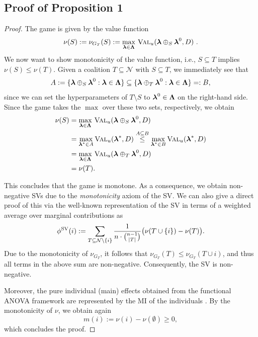 \documentclass[letterpaper]{article} %
\begin{document}
\subsection{Proof of Proposition 1}
\begin{proof}
The \dstunability game is given by the value function
\[
\nu(S) := \nu_{G_T}(S) := \max_{\boldsymbol{\lambda} \in \boldsymbol{\Lambda}}
\,\textsc{Val}_u(\boldsymbol{\lambda} \oplus_S \boldsymbol{\lambda}^0, D) \,\, .
\]
We now want to show monotonicity of the value function, i.e., $S \subseteq T$ implies $\nu(S) \leq \nu(T)$. 
Given a coalition $T \subseteq \mathcal N$ with $S \subseteq T$, we immediately see that
\[
    A := \{\boldsymbol{\lambda} \oplus_{S} \boldsymbol{\lambda}^0: \boldsymbol{\lambda} \in \boldsymbol{\Lambda} \} \subseteq \{ \boldsymbol{\lambda} \oplus_{T} \boldsymbol{\lambda}^0: \boldsymbol{\lambda} \in \boldsymbol{\Lambda} \} =: B,
\]
since we can set the hyperparameters of $T\setminus S$ to $\boldsymbol{\lambda}^0 \in \boldsymbol{\Lambda}$ on the right-hand side.
Since the \dstunability game takes the $\max$ over these two sets, respectively, we obtain
\begin{align*}
    \nu(S) &=  \max_{\boldsymbol{\lambda} \in \boldsymbol{\Lambda}} \,\textsc{Val}_u(\boldsymbol{\lambda} \oplus_S \boldsymbol{\lambda}^0, D)\\
    &= \max_{\boldsymbol{\lambda}^\ast \in A} \textsc{Val}_u(\boldsymbol{\lambda}^\ast, D) \overset{A \subseteq B}{\leq} \max_{\boldsymbol{\lambda}^\ast \in B} \textsc{Val}_u(\boldsymbol{\lambda}^\ast, D) \\
    &=  \max_{\boldsymbol{\lambda} \in \boldsymbol{\Lambda}}\,\textsc{Val}_u(\boldsymbol{\lambda} \oplus_T \boldsymbol{\lambda}^0, D)\\
    &= \nu(T).
\end{align*}

This concludes that the \dstunability game is monotone.
As a consequence, we obtain non-negative \glspl*{SV} due to the \emph{monotonicity} axiom \citep{Fujimoto.2006} of the \gls*{SV}.
We can also give a direct proof of this via the well-known representation of the \gls*{SV} in terms of a weighted average over marginal contributions as
\begin{align*}
    \phi^{\text{SV}}(i) := \sum_{T \subseteq \mathcal{N} \setminus \{i\}} \frac{1}{n \cdot \binom{n-1}{\vert T \vert }} \big(\nu(T \cup \{i\}) - \nu(T)\big).
\end{align*}
Due to the monotonicity of $\nu_{G_T}$, it follows that $\nu_{G_T}(T) \leq \nu_{G_T}(T \cup i)$, and thus all terms in the above sum are non-negative.
Consequently, the \gls*{SV} is non-negative.

Moreover, the pure individual (main) effects obtained from the functional ANOVA framework are represented by the \gls*{MI} of the individuals \citep{Fumagalli.2024a}.
By the monotonicity of $\nu$, we obtain again
\[
    m(i) := \nu(i) - \nu(\emptyset) \geq 0,
\]
which concludes the proof.
\end{proof}
\end{document}
